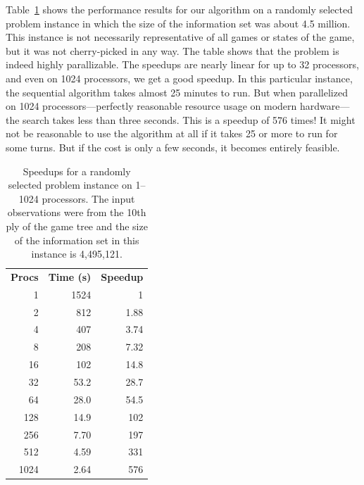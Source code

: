 \documentclass[times, 10pt,twocolumn]{article}
\begin{document}
Table~\ref{speedups} shows the performance results for our algorithm on a randomly selected problem instance in which
the size of the information set was about 4.5 million.  This instance is not necessarily representative of all games or
states of the game, but it was not cherry-picked in any way. The table shows that the problem is indeed highly
parallizable.  The speedups are nearly linear for up  to 32 processors, and even on 1024 processors, we get a good
speedup.  In this particular instance, the sequential algorithm takes almost 25 minutes to run.  But when parallelized
on 1024 processors---perfectly reasonable resource usage on modern hardware---the search takes less than three seconds.
This is a speedup of 576 times!  It might not be reasonable to use the algorithm at all if it takes 25 or more to run
for some turns.  But if the cost is only a few seconds, it becomes entirely feasible.

\begin{table}
\centering
\begin{tabular}{rrr}
{\bf Procs}	&	{\bf Time (s)} 	&	{\bf Speedup}\\
1	&	1524	&	1\\
2	&	812	&	1.88\\
4	&	407	&	3.74\\
8	&	208	&	7.32\\
16	&	102	&	14.8\\
32	&	53.2	&	28.7\\
64	&	28.0	&	54.5\\
128	&	14.9	&	102\\
256	&	7.70	&	197\\
512	&	4.59	&	331\\
1024	&	2.64	&	576\\
\end{tabular}
\vspace{-0.1in}
\caption{Speedups for a randomly selected problem instance on 1--1024 processors.  The input observations were from the
10th ply of the game tree and the size of the information set in this instance is 4,495,121.}
\label{speedups}
\vspace{-0.3in}
\end{table}
\end{document}
